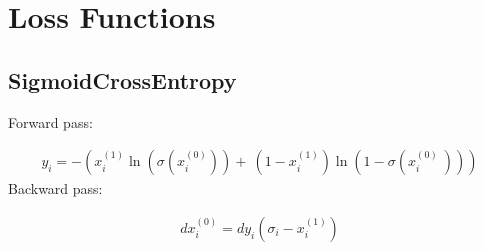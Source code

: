 \documentclass{article}
\begin{document}













\section{Loss Functions}
\label{sec:Loss Functions}

\subsection{SigmoidCrossEntropy}

Forward pass:

\begin{eqnarray}
  y_i = - \left(x^{(1)}_i \ln \left(\sigma \left(x^{(0)}_i \right)\right) + \
  \left(1 - x^{(1)}_i\right) \ln \left(1 - \sigma \left(x^{(0)}_i \
  \right)\right)\right)
\end{eqnarray}
%
Backward pass:

\begin{eqnarray}
  dx^{(0)}_i = dy_i (\sigma_i - x^{(1)}_i)
\end{eqnarray}
\end{document}
